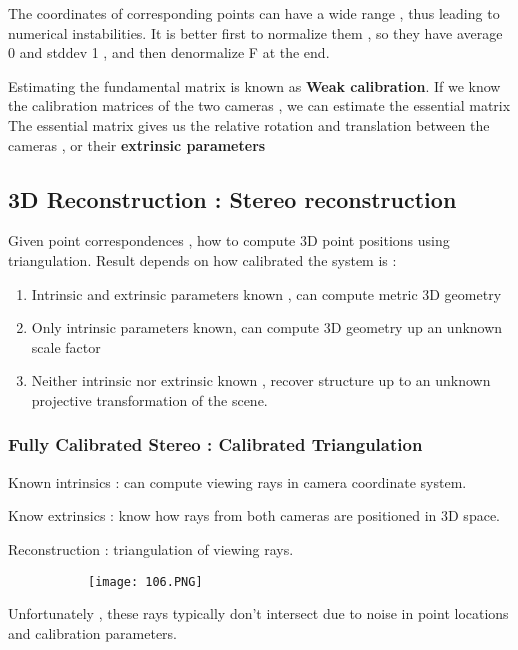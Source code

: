 \documentclass{article}
\begin{document}
The coordinates of corresponding points can have a wide range , thus leading to numerical instabilities.
It is better first to normalize them , so they have average 0 and stddev 1 , and then denormalize F at the end.

Estimating the fundamental matrix is known as \textbf{Weak calibration}.
If we know the calibration matrices of the two cameras , we can estimate the essential matrix
The essential matrix gives us the relative rotation and translation between the cameras , or their \textbf{extrinsic parameters}

\subsection{3D Reconstruction : Stereo reconstruction}

Given point correspondences , how to compute 3D point positions using triangulation.
Result depends on how calibrated the system is :
\begin{enumerate}
    \item Intrinsic and extrinsic parameters known , can compute metric 3D geometry
    \item Only intrinsic parameters known, can compute 3D geometry up an unknown scale factor
    \item Neither intrinsic nor extrinsic known , recover structure up to an unknown projective transformation of the scene.
\end{enumerate}


\subsubsection{Fully Calibrated Stereo : Calibrated Triangulation}

Known intrinsics : can compute viewing rays in camera coordinate system.

Know extrinsics : know how rays from both cameras are positioned in 3D space.

Reconstruction : triangulation of viewing rays.


\begin{figure}[ht!]
  \centering
  \begin{subfigure}[b]{0.4\linewidth}
    \texttt{[image: 106.PNG]}
  \end{subfigure}
\end{figure}

Unfortunately , these rays typically don't intersect due to noise in point locations and calibration parameters.
\end{document}
